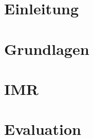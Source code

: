 \documentclass[12pt,twoside]{article}
\theoremstyle{plain}
\theoremstyle{definition}
\theoremstyle{remark}
\begin{document}
\section{Einleitung}

\section{Grundlagen} 
\label{sec:grundlagen}

\section{IMR}\label{sec:IMR}
\label{sec:methods}

\section{Evaluation}
\label{sec:evaluation}



%


\end{document}
